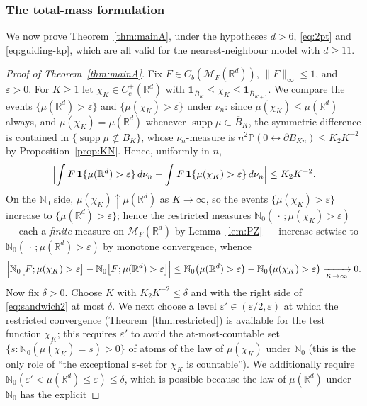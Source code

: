 \documentclass[11pt]{article}
\theoremstyle{definition}
\theoremstyle{remark}
\newcommand{\R}{\mathbb{R}}
\newcommand{\bP}{\mathbb{P}}
\newcommand{\bN}{{\mathbb{N}_0}}                 %
\newcommand{\cM}{{\mathcal{M}_F(\R^d)}}          %
\newcommand{\Cc}{C_c^+(\R^d)}
\newcommand{\supp}{\operatorname{supp}}
\newcommand{\eps}{\varepsilon}
\numberwithin{equation}{section}
\theoremstyle{plain}
\theoremstyle{definition}
\theoremstyle{remark}
\theoremstyle{plain}
\begin{document}
\subsubsection{The total-mass formulation}

We now prove Theorem~\ref{thm:mainA}, under the hypotheses $d>6$,
\eqref{eq:2pt} and \eqref{eq:guiding-kp}, which are all valid for the
nearest-neighbour model with $d\ge 11$.


\begin{proof}[Proof of Theorem~\ref{thm:mainA}]
Fix $F\in C_b(\cM)$, $\|F\|_\infty\le1$, and $\eps>0$. For $K\ge1$ let
$\chi_K\in\Cc$ with $\mathbf 1_{\overline B_K}\le\chi_K\le\mathbf 1_{\overline B_{K+1}}$. We
compare the events $\{\mu(\R^d)>\eps\}$ and $\{\mu(\chi_K)>\eps\}$ under
$\nu_n$: since $\mu(\chi_K)\le\mu(\R^d)$ always, and
$\mu(\chi_K)=\mu(\R^d)$ whenever $\supp\mu\subset\overline B_K$, the symmetric
difference is contained in $\{\supp\mu\not\subset\overline B_K\}$, whose
$\nu_n$-measure is
$n^2\bP(0\leftrightarrow\partial B_{Kn})\le K_2K^{-2}$ by
Proposition~\ref{prop:KN}. Hence, uniformly in $n$,
\begin{equation}\label{eq:sandwich1}
\Bigl|\int F\,\mathbf 1\{\mu(\R^d)>\eps\}\,d\nu_n
-\int F\,\mathbf 1\{\mu(\chi_K)>\eps\}\,d\nu_n\Bigr|\le K_2K^{-2}.
\end{equation}
On the $\bN$ side, $\mu(\chi_K)\uparrow\mu(\R^d)$ as $K\to\infty$, so the events
$\{\mu(\chi_K)>\eps\}$ increase to $\{\mu(\R^d)>\eps\}$; hence the restricted
measures $\bN(\,\cdot\,;\mu(\chi_K)>\eps)$ --- each a \emph{finite} measure on
$\cM$ by Lemma~\ref{lem:PZ} --- increase setwise to
$\bN(\,\cdot\,;\mu(\R^d)>\eps)$ by monotone convergence, whence
\begin{equation}\label{eq:sandwich2}
\Bigl|\bN\bigl[F;\mu(\chi_K)>\eps\bigr]
-\bN\bigl[F;\mu(\R^d)>\eps\bigr]\Bigr|
\le\bN\bigl(\mu(\R^d)>\eps\bigr)-\bN\bigl(\mu(\chi_K)>\eps\bigr)
\xrightarrow[K\to\infty]{}0 .
\end{equation}
Now fix $\delta>0$. Choose $K$ with $K_2K^{-2}\le\delta$ and with the
right side of \eqref{eq:sandwich2} at most $\delta$. We next choose a
level $\eps'\in(\eps/2,\eps)$ at which the restricted convergence
(Theorem~\ref{thm:restricted}) is available for the test function $\chi_K$;
this requires $\eps'$ to avoid the at-most-countable set
$\{s:\bN(\mu(\chi_K)=s)>0\}$ of atoms of the law of $\mu(\chi_K)$ under $\bN$
(this is the only role of ``the exceptional $\eps$-set for $\chi_K$ is
countable''). We additionally require $\bN(\eps'<\mu(\R^d)\le\eps)\le\delta$,
which is possible because the law of $\mu(\R^d)$ under $\bN$ has the explicit

\end{proof}
\end{document}
